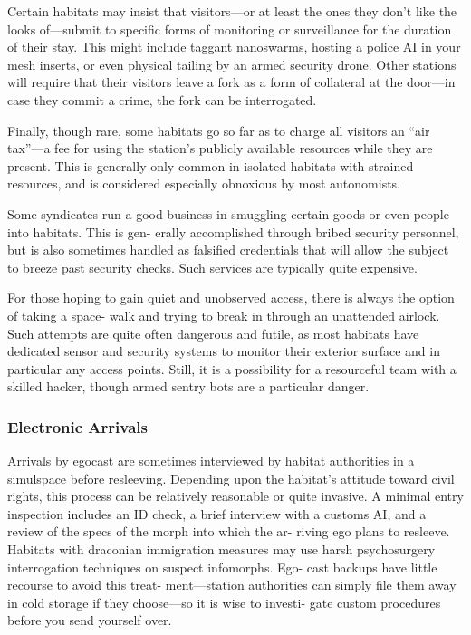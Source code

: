 Certain habitats may insist that visitors—or at 
least the ones they don't like the looks of—submit to 
specific forms of monitoring or surveillance for the 
duration of their stay. This might include taggant 
nanoswarms, hosting a police AI in your mesh inserts, 
or even physical tailing by an armed security drone. 
Other stations will require that their visitors leave a 
fork as a form of collateral at the door—in case they 
commit a crime, the fork can be interrogated.

Finally, though rare, some habitats go so far as to 
charge all visitors an ``air tax''—a fee for using the 
station's publicly available resources while they are 
present. This is generally only common in isolated 
habitats with strained resources, and is considered 
especially obnoxious by most autonomists.

Some syndicates run a good business in smuggling 
certain goods or even people into habitats. This is gen-
erally accomplished through bribed security personnel, 
but is also sometimes handled as falsified credentials 
that will allow the subject to breeze past security 
checks. Such services are typically quite expensive.

For those hoping to gain quiet and unobserved 
access, there is always the option of taking a space-
walk and trying to break in through an unattended 
airlock. Such attempts are quite often dangerous and 
futile, as most habitats have dedicated sensor and 
security systems to monitor their exterior surface and 
in particular any access points. Still, it is a possibility 
for a resourceful team with a skilled hacker, though 
armed sentry bots are a particular danger.

\subsubsection{Electronic Arrivals}

Arrivals by egocast are sometimes interviewed by 
habitat authorities in a simulspace before resleeving. 
Depending upon the habitat's attitude toward civil 
rights, this process can be relatively reasonable or 
quite invasive. A minimal entry inspection includes an 
ID check, a brief interview with a customs AI, and a 
review of the specs of the morph into which the ar-
riving ego plans to resleeve. Habitats with draconian 
immigration measures may use harsh psychosurgery 
interrogation techniques on suspect infomorphs. Ego-
cast backups have little recourse to avoid this treat-
ment—station authorities can simply file them away 
in cold storage if they choose—so it is wise to investi-
gate custom procedures before you send yourself over.

